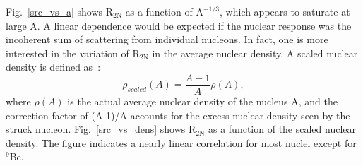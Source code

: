   Fig.~\ref{src_vs_a} shows $\mathrm{R_{2N}}$ as a function of $\mathrm{A^{-1/3}}$, which appears to saturate at large A. A linear dependence would be expected if the nuclear response was the incoherent sum of scattering from individual nucleons. In fact, one is more interested in the variation of $\mathrm{R_{2N}}$ in the average nuclear density. A scaled nuclear density is defined as~\cite{john_src_emc}:
  \begin{equation}
    \rho_{scaled}(A) = \frac{A-1}{A}\rho(A),
    \label{density_scaled}
  \end{equation}
where $\rho(A)$ is the actual average nuclear density of the nucleus A, and the correction factor of (A-1)/A accounts for the excess nuclear density seen by the struck nucleon. Fig.~\ref{src_vs_dens} shows $\mathrm{R_{2N}}$ as a function of the scaled nuclear density. The figure indicates a nearly linear correlation for most nuclei except for $\mathrm{^{9}Be}$. 

